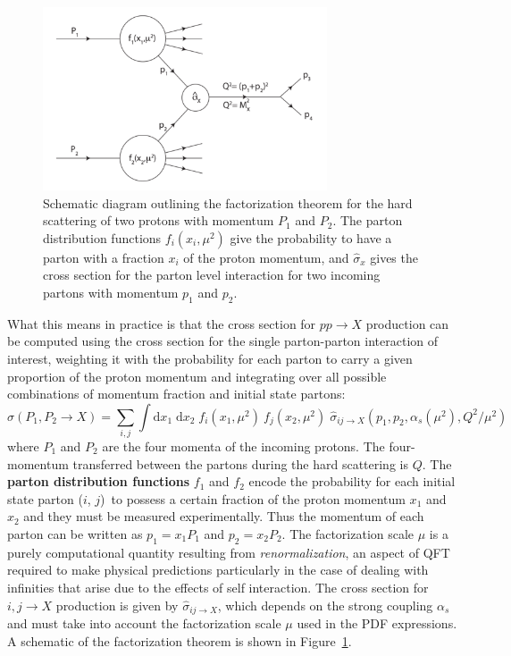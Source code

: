 \begin{figure}
	\centering
	\includegraphics[width=0.75\textwidth]{factorization_diagram}
	\caption{
	Schematic diagram outlining the factorization theorem for the hard scattering of two protons with momentum $P_1$ and $P_2$.
	The parton distribution functions $f_i(x_i, \mu^2)$ give the probability to have a parton with a fraction $x_i$ of the proton momentum, and $\hat{\sigma}_x$ gives the cross section for the parton level interaction for two incoming partons with momentum $p_1$ and $p_2$. \cite{ellis_stirling_webber_1996}
	}
	\label{fig:factorization_diagram}
\end{figure}

What this means in practice is that the cross section for $pp \rightarrow X$ production can be computed using the cross section for the single parton-parton interaction of interest, weighting it with the probability for each parton to carry a given proportion of the proton momentum and integrating over all possible combinations of momentum fraction and initial state partons:
\begin{equation}
\sigma(P_1, P_2 \rightarrow X) = \sum_{i,j} \int \mathrm{d}x_1\; \mathrm{d}x_2\; f_i(x_1, \mu^2)\ f_j(x_2, \mu^2)\; \hat{\sigma}_{ij \rightarrow X}\left(p_1, p_2, \alpha_s(\mu^2), Q^2 / \mu^2 \right)
\end{equation}
where $P_1$ and $P_2$ are the four momenta of the incoming protons.
The four-momentum transferred between the partons during the hard scattering is $Q$.
The \textbf{parton distribution functions} $f_1$ and $f_2$ encode the probability for each initial state parton ($i$, $j$)\ to possess a certain fraction of the proton momentum $x_1$ and $x_2$ and they must be measured experimentally.
Thus the momentum of each parton can be written as  $p_1 = x_1 P_1$ and $p_2 = x_2 P_2$.
The factorization scale $\mu$ is a purely computational quantity resulting from \textit{renormalization}, an aspect of QFT required to make physical predictions particularly in the case of dealing with infinities that arise due to the effects of self interaction.
The cross section for $i,j \rightarrow X$ production is given by $\hat{\sigma}_{ij \rightarrow X}$, which depends on the strong coupling $\alpha_s$ and must take into account the factorization scale $\mu$ used in the PDF expressions.
A schematic of the factorization theorem is shown in Figure~\ref{fig:factorization_diagram}.

